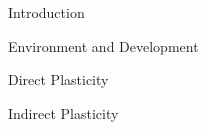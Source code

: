 \begin{block}{Introduction}

\begin{alertblock}{Environment and Development}

\end{alertblock}

\begin{alertblock}{Direct Plasticity
\cite{Fusco2010PhenotypicConcepts}}

\vspace{-2ex}
\end{alertblock}

\begin{alertblock}{Indirect Plasticity
\cite{Fusco2010PhenotypicConcepts}}

\vspace{-2ex}
\end{alertblock}

\end{block}